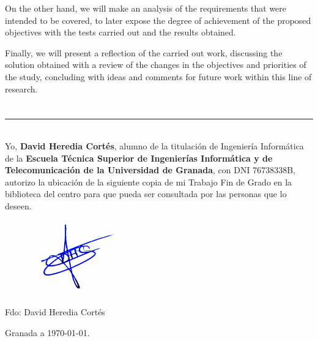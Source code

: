 On the other hand, we will make an analysis of the requirements that were intended to be covered, to later expose the degree of achievement of the proposed objectives with the tests carried out and the results obtained.

Finally, we will present a reflection of the carried out work, discussing the solution obtained with a review of the changes in the objectives and priorities of the study, concluding with ideas and comments for future work within this line of research.

\chapter*{}
\thispagestyle{empty}

\noindent\rule[-1ex]{\textwidth}{2pt}\\[4.5ex]

Yo, \textbf{David Heredia Cortés}, alumno de la titulación de Ingeniería Informática de la \textbf{Escuela Técnica Superior
de Ingenierías Informática y de Telecomunicación de la Universidad de Granada}, con DNI 76738338B, autorizo la
ubicación de la siguiente copia de mi Trabajo Fin de Grado en la biblioteca del centro para que pueda ser
consultada por las personas que lo deseen.

\vspace{1cm}

\begin{figure}[hbt]
	\centering
	\includegraphics[width=0.35\textwidth]{imagenes/firmaDavidHeredia.jpg}
\end{figure}

\noindent Fdo: David Heredia Cortés

\vspace{2cm}

\begin{flushright}
Granada a \today.
\end{flushright}


\chapter*{}
\thispagestyle{empty}

